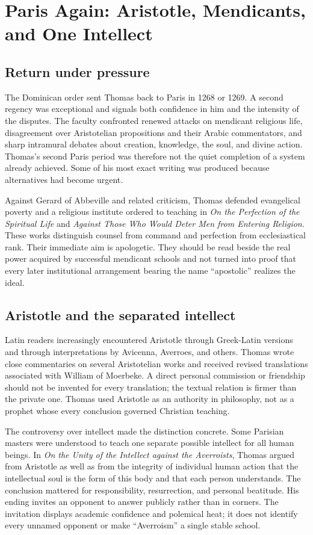 \section{Paris Again: Aristotle, Mendicants, and One Intellect}

\subsection{Return under pressure}

The Dominican order sent Thomas back to Paris in 1268 or 1269.  A second
regency was exceptional and signals both confidence in him and the intensity
of the disputes.  The faculty confronted renewed attacks on mendicant religious
life, disagreement over Aristotelian propositions and their Arabic
commentators, and sharp intramural debates about creation, knowledge, the soul,
and divine action.  Thomas's second Paris period was therefore not the quiet
completion of a system already achieved.  Some of his most exact writing was
produced because alternatives had become urgent.

Against Gerard of Abbeville and related criticism, Thomas defended evangelical
poverty and a religious institute ordered to teaching in \emph{On the
Perfection of the Spiritual Life} and \emph{Against Those Who Would Deter Men
from Entering Religion}.  These works distinguish counsel from command and
perfection from ecclesiastical rank.  Their immediate aim is apologetic.  They
should be read beside the real power acquired by successful mendicant schools
and not turned into proof that every later institutional arrangement bearing
the name ``apostolic'' realizes the ideal.

\subsection{Aristotle and the separated intellect}

Latin readers increasingly encountered Aristotle through Greek-Latin versions
and through interpretations by Avicenna, Averroes, and others.  Thomas wrote
close commentaries on several Aristotelian works and received revised
translations associated with William of Moerbeke.  A direct personal
commission or friendship should not be invented for every translation; the
textual relation is firmer than the private one.  Thomas used Aristotle as an
authority in philosophy, not as a prophet whose every conclusion governed
Christian teaching.

The controversy over intellect made the distinction concrete.  Some Parisian
masters were understood to teach one separate possible intellect for all human
beings.  In \emph{On the Unity of the Intellect against the Averroists}, Thomas
argued from Aristotle as well as from the integrity of individual human action
that the intellectual soul is the form of this body and that each person
understands.  The conclusion mattered for responsibility, resurrection, and
personal beatitude.  His ending invites an opponent to answer publicly rather
than in corners.  The invitation displays academic confidence and polemical
heat; it does not identify every unnamed opponent or make ``Averroism'' a
single stable school.

